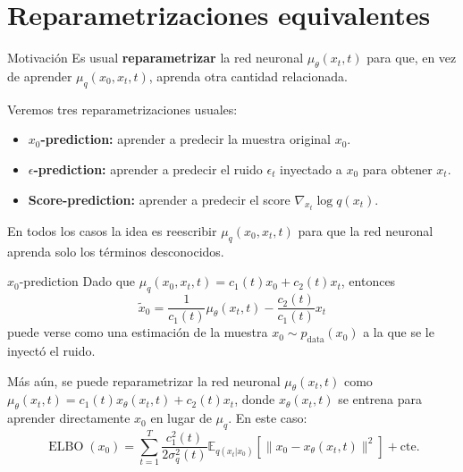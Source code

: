\documentclass{beamer}
\begin{document}
\section{Reparametrizaciones equivalentes}

\begin{frame}{Motivación}
    Es usual \textbf{reparametrizar} la red neuronal $\mu_\theta(x_t,t)$ para que, en vez de aprender $\mu_q(x_0,x_t,t)$, aprenda otra cantidad relacionada.

    Veremos tres reparametrizaciones usuales:
    \begin{itemize}
        \item \textbf{$x_0$-prediction:} aprender a predecir la muestra original $x_0$.
        \item \textbf{$\epsilon$-prediction:} aprender a predecir el ruido $\epsilon_t$ inyectado a $x_0$ para obtener $x_t$.
        \item \textbf{Score-prediction:} aprender a predecir el score $\nabla_{x_t}\log q(x_t)$.
    \end{itemize}
    En todos los casos la idea es reescribir $\mu_q(x_0,x_t,t)$ para que la red neuronal aprenda solo los términos desconocidos.
\end{frame}

\begin{frame}{$x_0$-prediction}
    Dado que $\mu_q(x_0,x_t,t)=c_1(t)x_0+c_2(t)x_t$, entonces
    \begin{equation*}
        \tilde x_0=\frac{1}{c_1(t)}\mu_\theta(x_t,t)-\frac{c_2(t)}{c_1(t)}x_t
    \end{equation*}
    puede verse como una estimación de la muestra $x_0\sim p_\text{data}(x_0)$ a la que se le inyectó el ruido.

    Más aún, se puede reparametrizar la red neuronal $\mu_\theta(x_t,t)$ como $\mu_\theta(x_t,t)=c_1(t)x_\theta(x_t,t)+c_2(t)x_t$, donde $x_\theta(x_t,t)$ se entrena para aprender directamente $x_0$ en lugar de $\mu_q$. En este caso:
    \begin{equation*}
        \operatorname{ELBO}(x_0) =
        \sum_{t=1}^T \frac{c_1^2(t)}{2\sigma_q^2(t)}\mathbb{E}_{q(x_t|x_0)}\left[\|x_0-x_\theta(x_t,t)\|^2\right]+\text{cte.}
    \end{equation*}
\end{frame}
\end{document}
